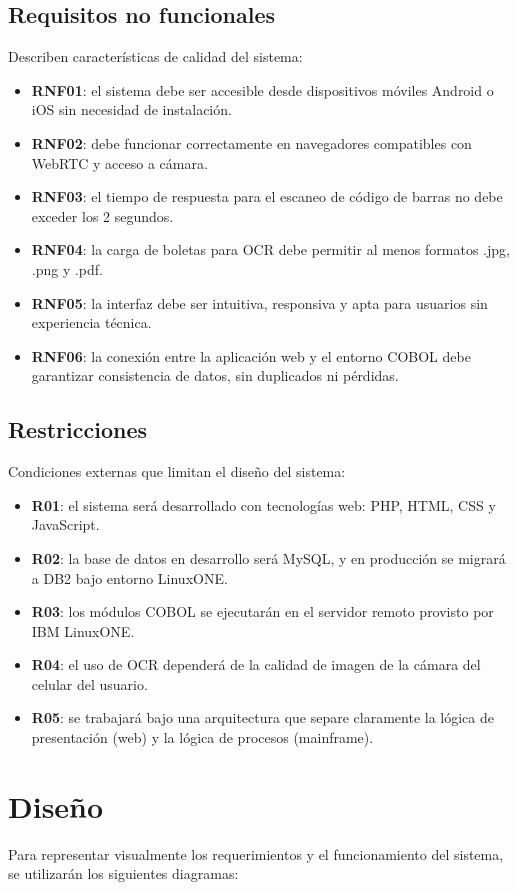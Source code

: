 \documentclass[twoside]{article}
\begin{document}
\subsection{Requisitos no funcionales}
Describen características de calidad del sistema:
\begin{itemize}
    \item \textbf{RNF01}: el sistema debe ser accesible desde dispositivos móviles Android o iOS sin necesidad de instalación.
    \item \textbf{RNF02}: debe funcionar correctamente en navegadores compatibles con WebRTC y acceso a cámara.
    \item \textbf{RNF03}: el tiempo de respuesta para el escaneo de código de barras no debe exceder los 2 segundos.
    \item \textbf{RNF04}: la carga de boletas para OCR debe permitir al menos formatos .jpg, .png y .pdf.
    \item \textbf{RNF05}: la interfaz debe ser intuitiva, responsiva y apta para usuarios sin experiencia técnica.
    \item \textbf{RNF06}: la conexión entre la aplicación web y el entorno COBOL debe garantizar consistencia de datos, sin duplicados ni pérdidas.
\end{itemize}

\subsection{Restricciones}
Condiciones externas que limitan el diseño del sistema:
\begin{itemize}
    \item \textbf{R01}: el sistema será desarrollado con tecnologías web: PHP, HTML, CSS y JavaScript.
    \item \textbf{R02}: la base de datos en desarrollo será MySQL, y en producción se migrará a DB2 bajo entorno LinuxONE.
    \item \textbf{R03}: los módulos COBOL se ejecutarán en el servidor remoto provisto por IBM LinuxONE.
    \item \textbf{R04}: el uso de OCR dependerá de la calidad de imagen de la cámara del celular del usuario.
    \item \textbf{R05}: se trabajará bajo una arquitectura que separe claramente la lógica de presentación (web) y la lógica de procesos (mainframe).
\end{itemize}

\section{Diseño}
Para representar visualmente los requerimientos y el funcionamiento del sistema, se utilizarán los siguientes diagramas:
\end{document}
